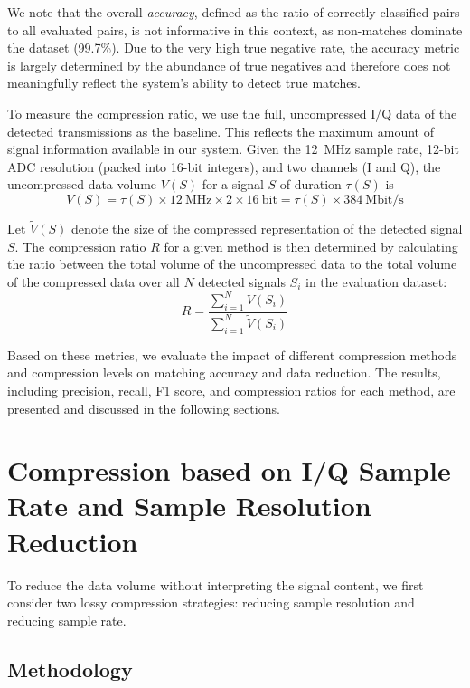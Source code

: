 \documentclass[sigconf, 10pt, nonacm, anonymous]{acmart}  %
\begin{document}
We note that the overall \emph{accuracy}, defined as the ratio of correctly classified pairs to all evaluated pairs, is not informative in this context, as non-matches dominate the dataset (99.7\%). Due to the very high true negative rate, the accuracy metric is largely determined by the abundance of true negatives and therefore does not meaningfully reflect the system's ability to detect true matches.

To measure the compression ratio, we use the full, uncompressed I/Q data of the detected transmissions as the baseline. This reflects the maximum amount of signal information available in our system. Given the 12~MHz sample rate, 12-bit ADC resolution (packed into 16-bit integers), and two channels (I and Q), the uncompressed data volume $V(S)$ for a signal $S$ of duration $\tau(S)$ is
$$V(S) = \tau(S) \times 12~\text{MHz} \times 2 \times 16~\text{bit} = \tau(S) \times 384~\text{Mbit/s}$$

Let $\tilde{V}(S)$ denote the size of the compressed representation of the detected signal $S$. The compression ratio $R$ for a given method is then determined by calculating the ratio between the total volume of the uncompressed data to the total volume of the compressed data over all $N$ detected signals $S_i$ in the evaluation dataset:
\begin{equation}
R = \frac{\sum_{i=1}^{N} V(S_i)}{\sum_{i=1}^{N} \tilde{V}(S_i)}
\label{eqn:compression_rate}
\end{equation}


Based on these metrics, we evaluate the impact of different compression methods and compression levels on matching accuracy and data reduction. The results, including precision, recall, F1 score, and compression ratios for each method, are presented and discussed in the following sections.

\section{Compression based on I/Q Sample Rate and Sample Resolution Reduction}

To reduce the data volume without interpreting the signal content, we first consider two lossy compression strategies: reducing sample resolution and reducing sample rate.

\subsection{Methodology}
\end{document}

